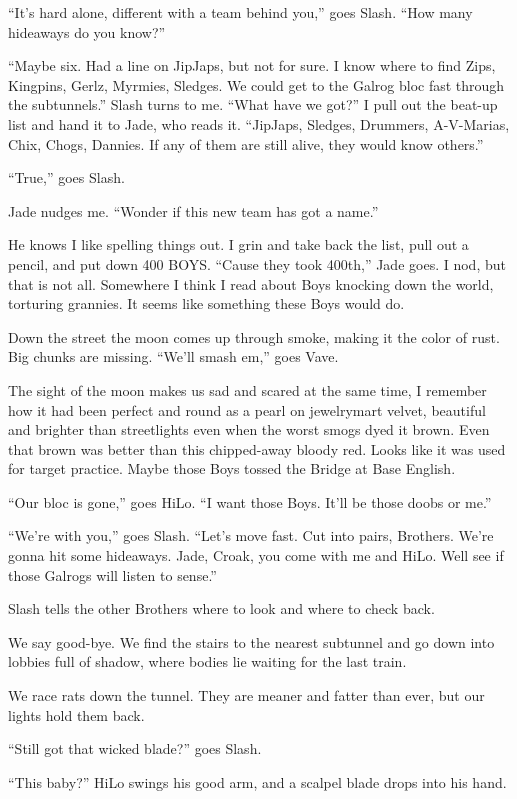 ``It's hard alone, different with a team behind you,'' goes Slash. ``How many hideaways do you know?''

``Maybe six. Had a line on JipJaps, but not for sure. I know where to find Zips, Kingpins, Gerlz, Myrmies, Sledges. We could get to the Galrog bloc fast through the subtunnels.''
Slash turns to me. ``What have we got?''
I pull out the beat-up list and hand it to Jade, who reads it. ``JipJaps, Sledges, Drummers, A-V-Marias, Chix, Chogs, Dannies. If any of them are still alive, they would know others.''

``True,'' goes Slash.

Jade nudges me. ``Wonder if this new team has got a name.''

He knows I like spelling things out. I grin and take back the list, pull out a pencil, and put down 400 BOYS.
``Cause they took 400th,'' Jade goes. I nod, but that is not all. Somewhere I think I read about Boys knocking down the world, torturing grannies. It seems like something these Boys would do.

Down the street the moon comes up through smoke, making it the color of rust. Big chunks are missing.
``We'll smash em,'' goes Vave.

The sight of the moon makes us sad and scared at the same time, I remember how it had been perfect and round as a pearl on jewelrymart velvet, beautiful and brighter than streetlights even when the worst smogs dyed it brown. Even that brown was better than this chipped-away bloody red. Looks like it was used for target practice. Maybe those Boys tossed the Bridge at Base English.

``Our bloc is gone,'' goes HiLo. ``I want those Boys. It'll be those doobs or me.''

``We're with you,'' goes Slash. ``Let's move fast. Cut into pairs, Brothers. We're gonna hit some hideaways. Jade, Croak, you come with me and HiLo. Well see if those Galrogs will listen to sense.''

Slash tells the other Brothers where to look and where to check back.

We say good-bye. We find the stairs to the nearest subtunnel and go down into lobbies full of shadow, where bodies lie waiting for the last train.

We race rats down the tunnel. They are meaner and fatter than ever, but our lights hold them back.

``Still got that wicked blade?'' goes Slash.

``This baby?'' HiLo swings his good arm, and a scalpel blade drops into his hand.

